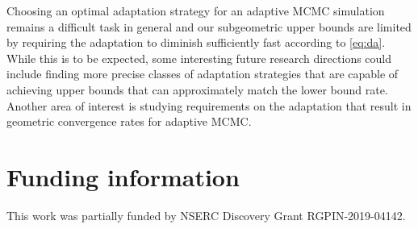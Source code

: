 \documentclass[12pt]{article}
\theoremstyle{plain}
\theoremstyle{remark}
\begin{document}
Choosing an optimal adaptation strategy for an adaptive MCMC simulation remains a difficult task in general and our subgeometric upper bounds are limited by requiring the adaptation to diminish sufficiently fast according to \eqref{eq:da}.
While this is to be expected, some interesting future research directions could include finding more precise classes of adaptation strategies that are capable of achieving upper bounds that can approximately match the lower bound rate.
Another area of interest is studying requirements on the adaptation that result in geometric convergence rates for adaptive MCMC.

\section*{Funding information}
This work was partially funded by NSERC Discovery Grant RGPIN-2019-04142.
\end{document}

